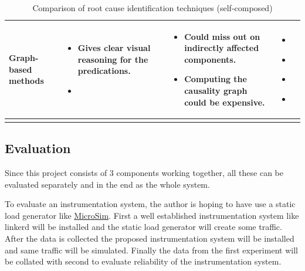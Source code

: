 \begin{longtable}{| p{23mm} | p{42mm} | p{42mm} | p{42mm} |}
    Graph-based methods &
    \vspace{-8mm}
    \begin{itemize}[leftmargin=0mm,noitemsep,nolistsep,label={}] 
        \item Gives clear visual reasoning for the predications.
        \item  
        \vspace{-7mm}
    \end{itemize} &
    \vspace{-8mm}
    \begin{itemize}[leftmargin=0mm,noitemsep,nolistsep,label={}] 
        \item Could miss out on indirectly affected components.
        \item Computing the causality graph could be expensive.
        \vspace{-7mm}
    \end{itemize} &
    \vspace{-8mm}
    \begin{itemize}[leftmargin=0mm,noitemsep,nolistsep,label={}] 
        \item \cite{samir2019dla}
        \item \cite{wu2020microrca}
        \item \cite{ma2020automap}
        \item \cite{meng2020localizing}
        \vspace{-7mm}
    \end{itemize} \\ \hline

    \caption{Comparison of root cause identification techniques (self-composed)}
\end{longtable}

\subsection{Evaluation}

Since this project consists of 3 components working together, all these can be evaluated separately and in the end as the whole system.

To evaluate an instrumentation system, the author is hoping to have use a static load generator like \href{https://github.com/MrSupiri/MicroSim}{MicroSim}. First a well established instrumentation system like linkerd will be installed and the static load generator will create some traffic. After the data is collected the proposed instrumentation system will be installed and same traffic  will be simulated. Finally the data from the first experiment will be collated with second to evaluate reliability of the instrumentation system.

